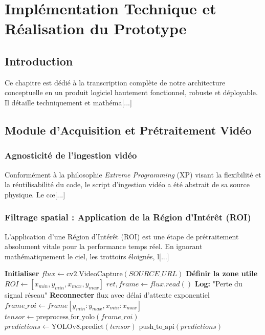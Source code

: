 \chapter{Implémentation Technique et Réalisation du Prototype}

\section{Introduction}
Ce chapitre est dédié à la transcription complète de notre architecture conceptuelle en un produit logiciel hautement fonctionnel, robuste et déployable. Il détaille techniquement et mathéma[...]

\section{Module d'Acquisition et Prétraitement Vidéo}

\subsection{Agnosticité de l'ingestion vidéo}
Conformément à la philosophie \textit{Extreme Programming} (XP) visant la flexibilité et la réutilisabilité du code, le script d'ingestion vidéo a été abstrait de sa source physique. Le cœ[...]

\subsection{Filtrage spatial : Application de la Région d'Intérêt (ROI)}
L'application d'une Région d'Intérêt (ROI) est une étape de prétraitement absolument vitale pour la performance temps réel. En ignorant mathématiquement le ciel, les trottoirs éloignés, l[...]

\begin{algorithm}[H]
\caption{Algorithme de prétraitement et d'application dynamique de la ROI}
\begin{algorithmic}[1]
\STATE \textbf{Initialiser} $flux \leftarrow \text{cv2.VideoCapture}(SOURCE\_URL)$
\STATE \textbf{Définir la zone utile} $ROI \leftarrow [x_{min}, y_{min}, x_{max}, y_{max}]$
    \STATE $ret, frame \leftarrow flux.read()$
        \STATE \textbf{Log:} "Perte du signal réseau"
        \STATE \textbf{Reconnecter} flux avec délai d'attente exponentiel
    \ENDIF
    \STATE {}
    \STATE $frame\_roi \leftarrow frame[y_{min}:y_{max}, x_{min}:x_{max}]$
    \STATE $tensor \leftarrow \text{preprocess\_for\_yolo}(frame\_roi)$ 
    \STATE $predictions \leftarrow \text{YOLOv8.predict}(tensor)$
    \STATE $\text{push\_to\_api}(predictions)$ 
\ENDWHILE
\end{algorithmic}
\end{algorithm}

